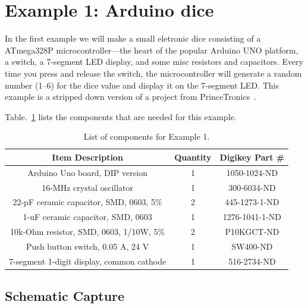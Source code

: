 \documentclass[12pt,letterpaper]{scrartcl}
\begin{document}
\section{Example 1: Arduino dice}
In the first example we will make a small eletronic dice consisting of a ATmega328P microcontroller---the heart of the popular Arduino UNO platform, a switch, a 7-segment LED display, and some misc resistors and capacitors. Every time you press and release the switch, the microcontroller will generate a random number (1--6) for the dice value and display it on the 7-segment LED. This example is a stripped down version of a project from PrinceTronics~\cite{dice}. 

Table.~\ref{tab:example1} lists the components that are needed for this example.

\begin{table}[h]
\centering
\caption{List of components for Example 1.}
\begin{tabular}{|c|c|c|}
\hline  Item Description & Quantity & Digikey Part \# \\ 
\hline  Arduino Uno board, DIP version & 1 & 1050-1024-ND \\ 
\hline  16-MHz crystal oscillator &  1 & 300-6034-ND \\ 
\hline  22-pF ceramic capacitor, SMD, 0603, 5\% & 2 & 445-1273-1-ND  \\ 
\hline  1-uF ceramic capacitor, SMD, 0603 & 1 & 1276-1041-1-ND \\ 
\hline  10k-Ohm resistor, SMD, 0603, 1/10W, 5\% & 2 & P10KGCT-ND \\ 
\hline  Push button switch, 0.05 A, 24 V  & 1 & SW400-ND \\ 
\hline  7-segment 1-digit display, 
common cathode & 1 & 516-2734-ND \\ 
\hline 
\end{tabular} 
\label{tab:example1}
\end{table}

\subsection{Schematic Capture}
\end{document}
